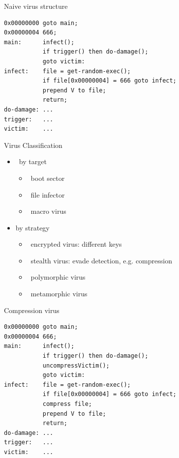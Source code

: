 \documentclass{beamer}
\begin{document}
\begin{frame}[fragile]{Naive virus structure}
  \begin{verbatim}
0x00000000 goto main;
0x00000004 666;
main:      infect();
           if trigger() then do-damage();
           goto victim:
infect:    file = get-random-exec();
           if file[0x00000004] = 666 goto infect;
           prepend V to file;
           return;
do-damage: ...
trigger:   ...
victim:    ...
  \end{verbatim}
\end{frame}


\begin{frame}{Virus Classification}
  \begin{itemize}
  \item  by target
    \begin{itemize}
    \item  boot sector 
    \item  file infector 
    \item  macro virus 
    \end{itemize}
  \item by strategy
    \begin{itemize}
    \item  encrypted virus: different keys 
    \item  stealth virus: evade detection, e.g. 
      compression 
    \item  polymorphic virus 
    \item  metamorphic virus
    \end{itemize}
  \end{itemize}
\end{frame}

\begin{frame}[fragile]{Compression virus}
  \begin{verbatim}
0x00000000 goto main;
0x00000004 666;
main:      infect();
           if trigger() then do-damage();
           uncompressVictim();
           goto victim:
infect:    file = get-random-exec();
           if file[0x00000004] = 666 goto infect;
           compress file;
           prepend V to file;
           return;
do-damage: ...
trigger:   ...
victim:    ...
  \end{verbatim}
\end{frame}
\end{document}
